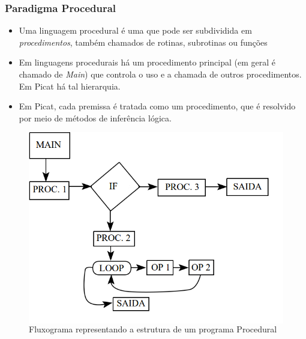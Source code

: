 \begin{frame}[fragile]
	\frametitle{Paradigma Procedural}
    
    \begin{itemize}
    
    	\item Uma linguagem procedural é uma que pode ser subdividida em \textit{procedimentos},
        também chamados de rotinas, subrotinas ou funções
        
        \pause
        \item Em linguagens procedurais há um procedimento principal (em geral é chamado de 
        \textit{Main}) que controla o uso e a chamada de outros procedimentos. Em Picat há
        tal hierarquia.
        
        \pause
        \item Em Picat, cada premissa é tratada como um procedimento, que é resolvido por meio
        de métodos de inferência lógica.
       
    \end{itemize}
    
\framebreak
    
    \begin{figure}
    	\begin{columns}
	         \includegraphics[width=.8\textwidth] {figures/Paradigma_Procedural.png}
             \caption{Fluxograma representando a estrutura de um programa Procedural}
	         \label{Fluxograma Procedural}
		\end{columns}
	\end{figure}
    
\end{frame}

